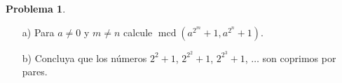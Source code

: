 \documentclass{article}
\DeclareMathOperator{\mcd}{mcd}
\theoremstyle{definition}
\newtheorem{problema}{Problema}
\newenvironment{solucion}{\begin{proof}[Solución]\small}{\end{proof}}
\begin{document}
\begin{problema}
  ~

  \begin{enumerate}
  \item[a)] Para $a \ne 0$ y $m \ne n$ calcule $\mcd (a^{2^m} + 1, a^{2^n} + 1)$.

  \item[b)] Concluya que los números $2^2 + 1$, $2^{2^2} + 1$, $2^{2^3} + 1$,
    $\ldots$ son coprimos por pares.
  \end{enumerate}


\end{problema}
\end{document}
